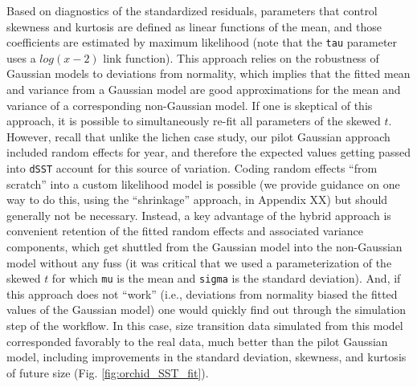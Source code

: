 \documentclass[12pt]{article}
\begin{document}
Based on diagnostics of the standardized residuals, parameters that control skewness and kurtosis are defined as linear functions of the mean, and those coefficients are estimated by maximum likelihood (note that the \verb|tau| parameter uses a $log(x-2)$ link function). 
This approach relies on the robustness of Gaussian models to deviations from normality, which implies that the fitted mean and variance from a Gaussian model are good approximations for the mean and variance of a corresponding non-Gaussian model. 
If one is skeptical of this approach, it is possible to simultaneously re-fit all parameters of the skewed $t$. 
However, recall that unlike the lichen case study, our pilot Gaussian approach included random effects for year, and therefore the expected values getting passed into \verb|dSST| account for this source of variation. 
Coding random effects ``from scratch'' into a custom likelihood model is possible (we provide guidance on one way to do this, using the ``shrinkage'' approach, in Appendix XX) but should generally not be necessary. 
Instead, a key advantage of the hybrid approach is convenient retention of the fitted random effects and associated variance components, which get shuttled from the Gaussian model into the non-Gaussian model without any fuss (it was critical that we used a parameterization of the skewed $t$ for which \verb|mu| is the mean and \verb|sigma| is the standard deviation). 
And, if this approach does not ``work'' (i.e., deviations from normality biased the fitted values of the Gaussian model) one would quickly find out through the simulation step of the workflow.
In this case, size transition data simulated from this model corresponded favorably to the real data, much better than the pilot Gaussian model, including improvements in the standard deviation, skewness, and kurtosis of future size (Fig. \ref{fig:orchid_SST_fit}). 
\end{document}
